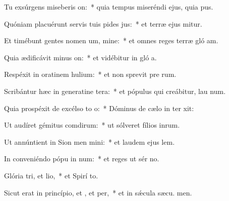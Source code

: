 \item Tu exsúrgens miseberis on:~* quia tempus miseréndi ejus, quia  pus.
\item Quóniam placuérunt servis tuis pides jus:~* et terræ ejus mitur.
\item Et timébunt gentes nomen um, mine:~* et omnes reges terræ gló am.
\item Quia ædificávit minus on:~* et vidébitur in gló a.
\item Respéxit in oratinem hulium:~* et non sprevit pre rum.
\item Scribántur hæc in generatine tera:~* et pópulus qui creábitur, lau num.
\item Quia prospéxit de excélso to o:~* Dóminus de cælo in ter xit:
\item Ut audíret gémitus comdirum:~* ut sólveret fílios inrum.
\item Ut annúntient in Sion men mini:~* et laudem ejus  lem.
\item In conveniéndo pópu in num:~* et reges ut sér no.
\item Glória tri, et lio,~* et Spirí to.
\item Sicut erat in princípio, et , et per,~* et in sǽcula sæcu. men.
